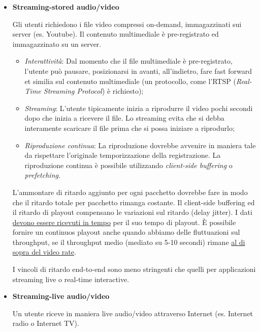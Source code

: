 \begin{itemize}

\item{\textbf{Streaming-stored audio/video}}

Gli utenti richiedono i file video compressi on-demand, immagazzinati sui server (es. Youtube). Il contenuto multimediale è pre-registrato ed immagazzinato su un server.

\begin{itemize}

\item{\textit{Interattività}}: Dal momento che il file multimediale è pre-registrato, l'utente può pausare, posizionarsi in avanti, all'indietro, fare fast forward et similia sul contenuto multimediale (un protocollo, come l'RTSP (\textit{Real-Time Streaming Protocol}) è richiesto);

\item{\textit{Streaming}}: L'utente tipicamente inizia a riprodurre il video pochi secondi dopo che inizia a ricevere il file. Lo streaming evita che si debba interamente scaricare il file prima che si possa iniziare a riprodurlo;

\item{\textit{Riproduzione continua}}: La riproduzione dovrebbe avvenire in maniera tale da rispettare l'originale temporizzazione della registrazione. La riproduzione continua è possibile utilizzando \textit{client-side buffering} o \textit{prefetching}.

\end{itemize}

L'ammontare di ritardo aggiunto per ogni pacchetto dovrebbe fare in modo che il ritardo totale per pacchetto rimanga costante.
Il client-side buffering ed il ritardo di playout compensano le variazioni sul ritardo (delay jitter). I dati \underline{devono essere ricevuti in tempo} per il suo tempo di playout. \`E possibile fornire un continuos playout anche quando abbiamo delle fluttuazioni sul throughput, se il throughput medio (mediato su 5-10 secondi) rimane \underline{al di sopra del video rate}.

I vincoli di ritardo end-to-end sono meno stringenti che quelli per applicazioni streaming live o real-time interactive.

\item{\textbf{Streaming-live audio/video}}

Un utente riceve in maniera live audio/video attraverso Internet (es. Internet radio o Internet TV).


\end{itemize}
